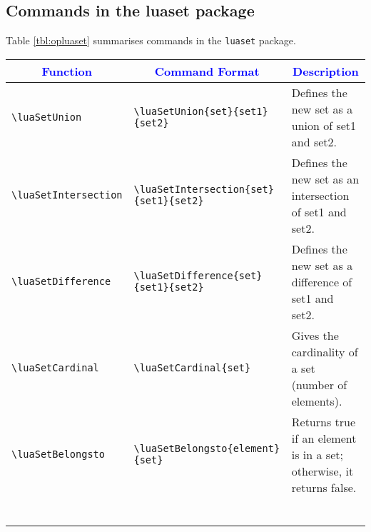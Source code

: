 \documentclass{article}
\begin{document}
\subsection{Commands in the luaset package}
Table \ref{tbl:opluaset} summarises commands in the \verb|luaset| package.
\begin{center}
\begin{longtable}{llm{5cm}}
\toprule
\multicolumn{1}{c}{\textcolor{blue}{Function}} & \multicolumn{1}{c}{\textcolor{blue}{Command Format}} & \multicolumn{1}{c}{\textcolor{blue}{Description}}  \\
\toprule
\begin{lstlisting}
\luaSetUnion
\end{lstlisting} &
\begin{lstlisting}
\luaSetUnion{set}{set1}{set2}
\end{lstlisting} & Defines the new set as a union of set1 and set2. \\
\midrule
\begin{lstlisting}
\luaSetIntersection
\end{lstlisting} &
\begin{lstlisting}
\luaSetIntersection{set}{set1}{set2}
\end{lstlisting} & Defines the new set as an intersection of set1 and set2. \\
\midrule
\begin{lstlisting}
\luaSetDifference
\end{lstlisting} &
\begin{lstlisting}
\luaSetDifference{set}{set1}{set2}
\end{lstlisting} & Defines the new set as a difference of set1 and set2. \\
\midrule
\begin{lstlisting}
\luaSetCardinal
\end{lstlisting} &
\begin{lstlisting}
\luaSetCardinal{set}
\end{lstlisting} & Gives the cardinality of a set (number of elements). \\
\midrule
\begin{lstlisting}
\luaSetBelongsto
\end{lstlisting} &
\begin{lstlisting}
\luaSetBelongsto{element}{set}
\end{lstlisting} & Returns true if an element is in a set; otherwise, it returns false.\\
\midrule
\begin{lstlisting}

\end{lstlisting}
\end{longtable}
\end{center}
\end{document}
